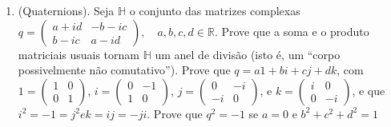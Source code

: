 \begin{enumerate}[label=10.\arabic*.]
    \item (Quaternions). Seja $\mathbb{H}$ o conjunto das matrizes complexas 
    $q = \begin{pmatrix} a+id & -b-ic \\ b-ic & a-id \end{pmatrix}, \quad a,b,c,d \in \mathbb{R}$.
    Prove que a soma e o produto matriciais usuais tornam $\mathbb{H}$ um anel de divisão (isto é, um 
    ``corpo possivelmente não comutativo''). 
    Prove que $q = a1 + b i + c j + d k$, com $1 = \begin{pmatrix} 1 & 0 \\ 0 & 1 \end{pmatrix}$,  
    $i = \begin{pmatrix} 0 & -1 \\ 1 & 0 \end{pmatrix}$, $j = \begin{pmatrix} 0 & -i \\ -i & 0 \end{pmatrix}$, e 
    $k = \begin{pmatrix} i & 0 \\ 0 & -i \end{pmatrix}$, e que $i^2 = -1 = j^2 e k = ij = -ji$.
    Prove que $q^2 = -1$ se $a = 0$ e $b^2 + c^2 + d^2 = 1$ 

\end{enumerate}
